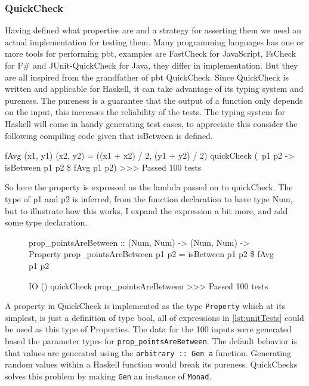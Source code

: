 \subsubsection{QuickCheck}
Having defined what properties are and a strategy for asserting them we need an actual implementation for testing them. Many programming languages has one or more tools for performing \acrshort{pbt}, examples are FastCheck for JavaScript, FsCheck for F\# and JUnit-QuickCheck for Java, they differ in implementation. But they are all inspired from the grandfather of \acrshort{pbt} QuickCheck\parencite{quickCheck}. Since QuickCheck is written and applicable for Haskell, it can take advantage of its typing system and pureness.
The pureness is a guarantee that the output of a function only depends on the input, this increases the reliability of the tests. The typing system for Haskell will come in handy generating test cases, to appreciate this consider the following compiling code given that isBetween is defined.
\begin{hscode}
    fAvg (x1, y1) (x2, y2) = ((x1 + x2) / 2, (y1 + y2) / 2)
    quickCheck (\ p1 p2 -> isBetween p1 p2 \$ fAvg p1 p2) 
    >>> Passed 100 tests
\end{hscode}
So here the property is expressed as the lambda passed on to quickCheck. The type of p1 and p2 is inferred, from the function declaration to have type Num, but to illustrate how this works, I expand the expression a bit more, and add some type declaration.
\begin{figure}[H]
\begin{hscode}
    prop_pointsAreBetween :: (Num, Num) -> (Num, Num) -> Property
    prop_pointsAreBetween p1 p2 = isBetween p1 p2 \$ fAvg p1 p2

    IO () 
    quickCheck prop_pointsAreBetween 
    >>> Passed 100 tests
\end{hscode}
\label{lst:qcExample}
\end{figure}
A property in QuickCheck is implemented as the type \verb|Property| which at its simplest, is just a definition of type bool, all of expressions in \ref{lst:unitTests} could be used as this type of Properties. The data for the 100 inputs were generated based the parameter types for \verb|prop_pointsAreBetween|. The default behavior is that values are generated using the \verb|arbitrary :: Gen a| function. Generating random values within a Haskell function would break its pureness. QuickChecks solves this problem by making \verb|Gen| an instance of \verb|Monad|.

